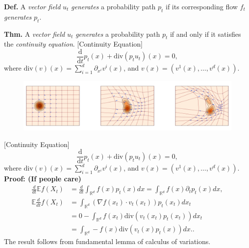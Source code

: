 \documentclass{beamer}
\begin{document}
\begin{frame}
    \textbf{Def.} A \emph{vector field} \( u_t \) \emph{generates} a probability path \( p_t \) if its corresponding flow \( f_t \) \emph{generates} \( p_t \).
    \par
    \textbf{Thm.} A \emph{vector field} \( u_t \) \emph{generates} a probability path \( p_t \) if and only if it satisfies the \emph{continuity equation}.
    [Continuity Equation]{
    \[ \frac{\mathrm{d}}{\mathrm{d}t}p_t(x) + \mathrm{div}(p_t u_t)(x) = 0, \]
    where $\text{div}(v)(x) = \sum_{i=1}^{d} \partial_{x^{i}} v^{i}(x)$, and $v(x) = (v^{1}(x), \ldots, v^{d}(x))$.
    }
    \begin{figure}
        \centering
        \includegraphics[width=\linewidth]{figures/density-vis.png}
    \end{figure}
\end{frame}
\begin{frame}
    [Continuity Equation]{
    \[ \frac{\mathrm{d}}{\mathrm{d}t}p_t(x) + \mathrm{div}(p_t u_t)(x) = 0, \]
    where $\text{div}(v)(x) = \sum_{i=1}^{d} \partial_{x^{i}} v^{i}(x)$, and $v(x) = (v^{1}(x), \ldots, v^{d}(x))$.
    }
    \textbf{Proof: (If people care)}
    \begin{align*}
        \frac{d}{dt}\mathbb{E}f(X_t) &= \frac{d}{dt}\int_{\mathbb{R}^d} f(x)p_t(x)dx = \int_{\mathbb{R}^d} f(x)\partial_t p_t(x)dx, \\
     \mathbb{E}\frac{d}{dt}f(X_t) &= \int_{\mathbb{R}^d} \left(\nabla f(x_t)\cdot v_t(x_t)\right) p_t(x_t)dx_t \\  
                                  &= 0 - \int_{\mathbb{R}^d} f(x_t)\text{div}(v_t(x_t)p_t(x_t))dx_t \tag*{(IBP)}\\ 
                                  &= \int_{\mathbb{R}^d} -f(x)\text{div}(v_t(x)p_t(x))dx.
    .\end{align*}
    The result follows from fundamental lemma of calculus of variations.
\end{frame}
\end{document}
